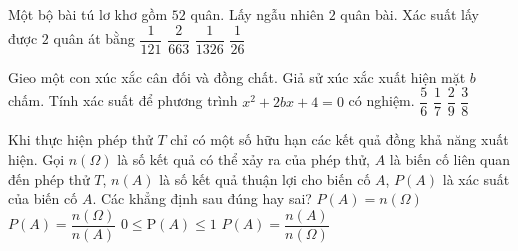 \begin{ex}%
	Một bộ bài tú lơ khơ gồm $52$ quân. Lấy ngẫu nhiên $2$ quân bài. Xác suất lấy được $2$ quân át  bằng
	 \choice
		 {\True $\dfrac{1}{121}$}
		 {$\dfrac{2}{663}$}
		{$\dfrac{1}{1326}$} 
		 {$\dfrac{1}{26}$}
\end{ex}

\begin{ex}%
	Gieo một con xúc xắc cân đối và đồng chất. Giả sử xúc xắc xuất hiện mặt $b$ chấm. Tính xác suất để phương trình  $x^2 + 2bx + 4 = 0$ có nghiệm.
	\choice 
		{\True  $\dfrac{5}{6}$}
		{$\dfrac{1}{7}$} 
		 {$\dfrac{2}{9}$}
		{$\dfrac{3}{8}$} 
\end{ex}



\begin{ex}%
	Khi thực hiện phép thử $T$ chỉ có một số hữu hạn các kết quả đồng khả năng xuất hiện. Gọi $n(\Omega)$ là số kết quả có thể xảy ra của phép thử, $A$ là biến cố liên quan đến phép thử $T$, $n(A)$ là số kết quả thuận lợi cho biến cố $A$, $P(A)$ là  xác suất của biến cố $A$. Các khẳng định sau đúng hay sai?
	\choiceTF 
		{$P(A)=n(\Omega)$} 
		{$P(A)=\dfrac{n(\Omega)}{n(A)}$} 
		{\True $ 0\leq \mathrm{P}(A)\leq 1  $}
		{\True  $P(A)=\dfrac{n(A)}{n(\Omega)}$}
\end{ex}

